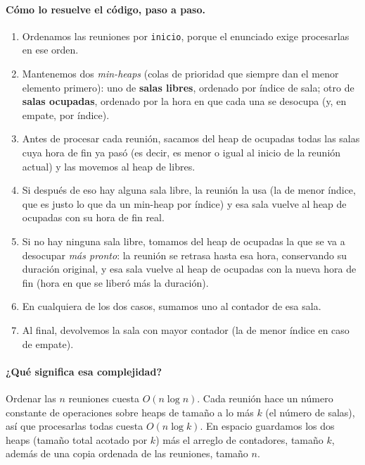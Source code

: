 \paragraph{Cómo lo resuelve el código, paso a paso.}
\begin{enumerate}
  \item Ordenamos las reuniones por \texttt{inicio}, porque el enunciado
        exige procesarlas en ese orden.
  \item Mantenemos dos \emph{min-heaps} (colas de prioridad que siempre dan
        el menor elemento primero): uno de \textbf{salas libres}, ordenado
        por índice de sala; otro de \textbf{salas ocupadas}, ordenado por
        la hora en que cada una se desocupa (y, en empate, por índice).
  \item Antes de procesar cada reunión, sacamos del heap de ocupadas todas
        las salas cuya hora de fin ya pasó (es decir, es menor o igual al
        inicio de la reunión actual) y las movemos al heap de libres.
  \item Si después de eso hay alguna sala libre, la reunión la usa (la de
        menor índice, que es justo lo que da un min-heap por índice) y esa
        sala vuelve al heap de ocupadas con su hora de fin real.
  \item Si no hay ninguna sala libre, tomamos del heap de ocupadas la que se
        va a desocupar \emph{más pronto}: la reunión se retrasa hasta esa
        hora, conservando su duración original, y esa sala vuelve al heap
        de ocupadas con la nueva hora de fin (hora en que se liberó más la
        duración).
  \item En cualquiera de los dos casos, sumamos uno al contador de esa sala.
  \item Al final, devolvemos la sala con mayor contador (la de menor índice
        en caso de empate).
\end{enumerate}




\paragraph{¿Qué significa esa complejidad?} Ordenar las $n$ reuniones cuesta
$O(n \log n)$. Cada reunión hace un número constante de operaciones sobre
heaps de tamaño a lo más $k$ (el número de salas), así que procesarlas
todas cuesta $O(n \log k)$. En espacio guardamos los dos heaps (tamaño total
acotado por $k$) más el arreglo de contadores, tamaño $k$, además de una
copia ordenada de las reuniones, tamaño $n$.

